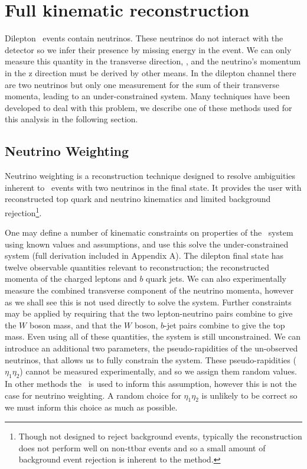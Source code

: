 \clearpage

\section{Full kinematic reconstruction}
Dilepton \ttbar\ events contain neutrinos. These neutrinos do not interact with the detector so we infer their presence by missing energy in the event. We can only measure this quantity in the transverse direction, \etmiss, and the neutrino's momentum in the z direction must be derived by other means. In the dilepton channel there are two neutrinos but only one measurement for the sum of their transverse momenta, leading to an under-constrained system. Many techniques have been developed to deal with this problem, we describe one of these methods used for this analysis in the following section.

\subsection{Neutrino Weighting}

Neutrino weighting is a reconstruction technique designed to resolve ambiguities inherent to \ttbar\ events with two neutrinos in the final state. It provides the user with reconstructed top quark and neutrino kinematics and limited background rejection\footnote{Though not designed to reject background events, typically the reconstruction does not perform well on non-ttbar events and so a small amount of background event rejection is inherent to the method.}. 

One may define a number of kinematic constraints on properties of the \ttbar\ system using known values and assumptions, and use this solve the under-constrained system (full derivation included in Appendix A). The dilepton final state has twelve observable quantities relevant to reconstruction; the reconstructed momenta of the charged leptons and $b$ quark jets. We can also experimentally measure the combined transverse component of the neutrino momenta, however as we shall see this is not used directly to solve the system. Further constraints may be applied by requiring that the two lepton-neutrino pairs combine to give the $W$ boson mass, and that the $W$ boson, $b$-jet pairs combine to give the top mass. Even using all of these quantities, the system is still unconstrained. We can introduce an additional two parameters, the pseudo-rapidities of the un-observed neutrinos, that allows us to fully constrain the system. These pseudo-rapidities ($\eta_1\eta_2$) cannot be measured experimentally, and so we assign them random values. In other methods the \etmiss\ is used to inform this assumption, however this is not the case for neutrino weighting. A random choice for $\eta_1\eta_2$ is unlikely to be correct so we must inform this choice as much as possible.
      

